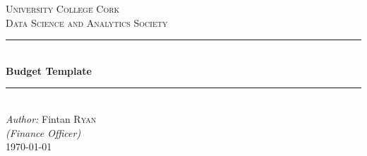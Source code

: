 \documentclass[11pt]{article}
\begin{document}
\begin{titlepage}

\newcommand{\HRule}{\rule{\linewidth}{0.5mm}} %

\center %
 

\textsc{\LARGE University College Cork}\\[1.5cm] %
\textsc{\Large Data Science and Analytics Society}\\[0.5cm] %


\HRule \\[0.4cm]
{ \huge \bfseries Budget Template}\\[0.4cm] %
\HRule \\[1.5cm]
 


\Large \emph{Author:}
Fintan \textsc{Ryan} \\ \emph{(Finance Officer)} \\[3cm]%



{\large \today}\\[2cm] %



\end{titlepage}
\end{document}

